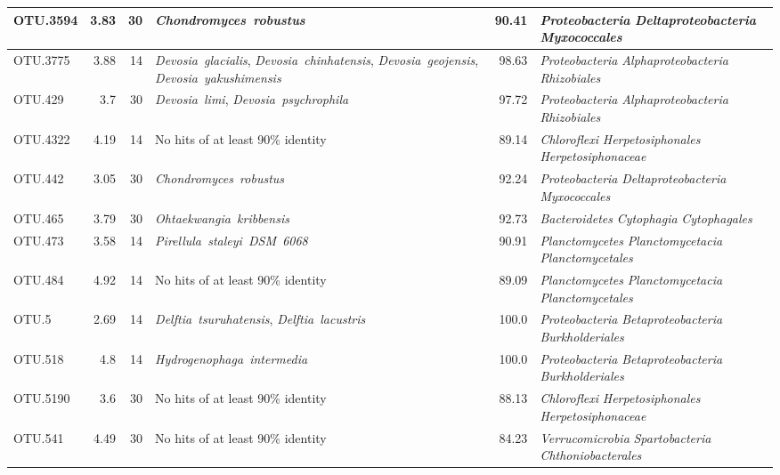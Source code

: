 \begin{ThreePartTable}
\begin{longtable}{lrrP{5cm}rP{5cm}}
OTU.3594 & 3.83 & 30 & \mbox{\textit{Chondromyces robustus}} & 90.41 & \mbox{\textit{Proteobacteria}} \mbox{\textit{Deltaproteobacteria}} \mbox{\textit{Myxococcales}} \\ \midrule
OTU.3775 & 3.88 & 14 & \mbox{\textit{Devosia glacialis}}, \mbox{\textit{Devosia chinhatensis}}, \mbox{\textit{Devosia geojensis}}, \mbox{\textit{Devosia yakushimensis}} & 98.63 & \mbox{\textit{Proteobacteria}} \mbox{\textit{Alphaproteobacteria}} \mbox{\textit{Rhizobiales}} \\ \midrule
OTU.429 & 3.7 & 30 & \mbox{\textit{Devosia limi}}, \mbox{\textit{Devosia psychrophila}} & 97.72 & \mbox{\textit{Proteobacteria}} \mbox{\textit{Alphaproteobacteria}} \mbox{\textit{Rhizobiales}} \\ \midrule
OTU.4322 & 4.19 & 14 & {No hits of at least 90\% identity} & 89.14 & \mbox{\textit{Chloroflexi}} \mbox{\textit{Herpetosiphonales}} \mbox{\textit{Herpetosiphonaceae}} \\ \midrule
OTU.442 & 3.05 & 30 & \mbox{\textit{Chondromyces robustus}} & 92.24 & \mbox{\textit{Proteobacteria}} \mbox{\textit{Deltaproteobacteria}} \mbox{\textit{Myxococcales}} \\ \midrule
OTU.465 & 3.79 & 30 & \mbox{\textit{Ohtaekwangia kribbensis}} & 92.73 & \mbox{\textit{Bacteroidetes}} \mbox{\textit{Cytophagia}} \mbox{\textit{Cytophagales}} \\ \midrule
OTU.473 & 3.58 & 14 & \mbox{\textit{Pirellula staleyi DSM 6068}} & 90.91 & \mbox{\textit{Planctomycetes}} \mbox{\textit{Planctomycetacia}} \mbox{\textit{Planctomycetales}} \\ \midrule
OTU.484 & 4.92 & 14 & {No hits of at least 90\% identity} & 89.09 & \mbox{\textit{Planctomycetes}} \mbox{\textit{Planctomycetacia}} \mbox{\textit{Planctomycetales}} \\ \midrule
OTU.5 & 2.69 & 14 & \mbox{\textit{Delftia tsuruhatensis}}, \mbox{\textit{Delftia lacustris}} & 100.0 & \mbox{\textit{Proteobacteria}} \mbox{\textit{Betaproteobacteria}} \mbox{\textit{Burkholderiales}} \\ \midrule
OTU.518 & 4.8 & 14 & \mbox{\textit{Hydrogenophaga intermedia}} & 100.0 & \mbox{\textit{Proteobacteria}} \mbox{\textit{Betaproteobacteria}} \mbox{\textit{Burkholderiales}} \\ \midrule
OTU.5190 & 3.6 & 30 & {No hits of at least 90\% identity} & 88.13 & \mbox{\textit{Chloroflexi}} \mbox{\textit{Herpetosiphonales}} \mbox{\textit{Herpetosiphonaceae}} \\ \midrule
OTU.541 & 4.49 & 30 & {No hits of at least 90\% identity} & 84.23 & \mbox{\textit{Verrucomicrobia}} \mbox{\textit{Spartobacteria}} \mbox{\textit{Chthoniobacterales}} \\ \midrule

\end{longtable}
\end{ThreePartTable}
